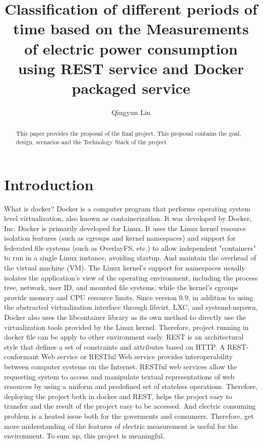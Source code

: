
\title{
Classification of different periods of time based on the Measurements of electric power consumption using REST service and Docker packaged service}


\author{Qingyun Lin}

\renewcommand{\shortauthors}{G. v. Laszewski}


\begin{abstract}
This paper provides the proposal of the final project. This proposal contains the goal, design, scenarios and the Technology Stack of the project
\end{abstract}



\maketitle

\section{Introduction}

What is docker? Docker is a computer program that performs operating system level virtualization, also known as containerization. It was developed by Docker, Inc. Docker is primarily developed for Linux. It uses the Linux kernel resource isolation features (such as cgroups and kernel namespaces) and support for federated file systems (such as OverlayFS, etc.) to allow independent "containers" to run in a single Linux instance, avoiding startup. And maintain the overhead of the virtual machine (VM). The Linux kernel's support for namespaces usually isolates the application's view of the operating environment, including the process tree, network, user ID, and mounted file systems, while the kernel's cgroups provide memory and CPU resource limits. Since version 0.9, in addition to using the abstracted virtualization interface through libvirt, LXC, and systemd-nspawn, Docker also uses the libcontainer library as its own method to directly use the virtualization tools provided by the Linux kernel. Therefore, project running in docker file can be apply to other environment easly. REST is an architectural style that defines a set of constraints and attributes based on HTTP. A REST-conformant Web service or RESTful Web service provides interoperability between computer systems on the Internet. RESTful web services allow the requesting system to access and manipulate textual representations of web resources by using a uniform and predefined set of stateless operations. Therefore, deploying the project both in docker and REST, helps the project easy to transfer and the result of the project easy to be accessed. And electric consuming problem is a heated issue both for the goverments and consumers. Therefore, get more understanding of the features of electric measurement is useful for the environment. To sum up, this project is meaningful.

